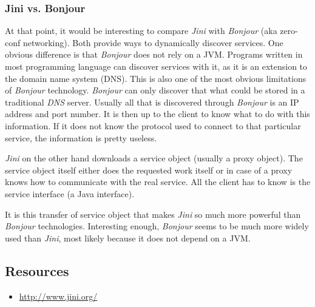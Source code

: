 \subsubsection{Jini vs. Bonjour}
At that point, it would be interesting to compare \emph{Jini} with \emph{Bonjour} (aka zero-conf networking). Both provide ways to dynamically discover services. One obvious difference is that \emph{Bonjour} does not rely on a JVM. Programs written in most programming language can discover services with it, as it is an extension to the domain name system (DNS). This is also one of the most obvious limitations of \emph{Bonjour} technology. \emph{Bonjour} can only discover that what could be stored in a traditional \emph{DNS} server. Usually all that is discovered through \emph{Bonjour} is an IP address and port number. It is then up to the client to know what to do with this information. If it does not know the protocol used to connect to that particular service, the information is pretty useless.

\emph{Jini} on the other hand downloads a service object (usually a proxy object). The service object itself either does the requested work itself or in case of a proxy knows how to communicate with the real service. All the client has to know is the service interface (a Java interface).

It is this transfer of service object that makes \emph{Jini} so much more powerful than \emph{Bonjour} technologies. Interesting enough, \emph{Bonjour} seems to be much more widely used than \emph{Jini}, most likely because it does not depend on a JVM.



\subsection{Resources}
\begin{itemize}
 \item \url{http://www.jini.org/}
\end{itemize}
